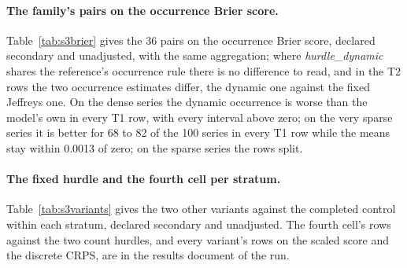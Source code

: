 \paragraph{The family's pairs on the occurrence Brier score.} Table~\ref{tab:s3brier} gives the 36 pairs
on the occurrence Brier score, declared secondary and unadjusted, with the same aggregation; where
\emph{hurdle\_dynamic} shares the reference's occurrence rule there is no difference to read, and in the T2
rows the two occurrence estimates differ, the dynamic one against the fixed Jeffreys one. On the dense
series the dynamic occurrence is worse than the model's own in every T1 row, with every interval above
zero; on the very sparse series it is better for 68 to 82 of the 100 series in every T1 row while the means
stay within 0.0013 of zero; on the sparse series the rows split.

\paragraph{The fixed hurdle and the fourth cell per stratum.} Table~\ref{tab:s3variants} gives the two
other variants against the completed control within each stratum, declared secondary and unadjusted. The
fourth cell's rows against the two count hurdles, and every variant's rows on the scaled score and the
discrete CRPS, are in the results document of the run.

